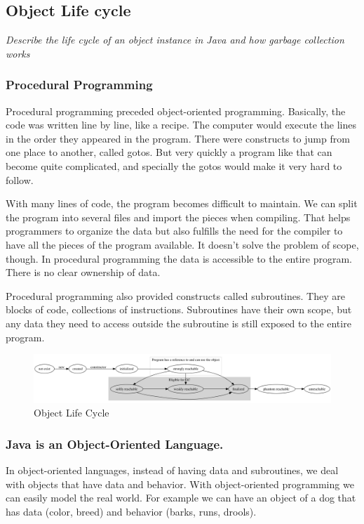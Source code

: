 \subsection{Object Life cycle}
\begin{center}\textit{Describe the life cycle of an object instance in Java and how garbage collection works}\end{center}

\subsubsection{Procedural Programming} 
Procedural programming preceded object-oriented programming. Basically, the code was written line by line, like a recipe. The computer would execute the lines in the order they appeared in the program. There were constructs to jump from one place to another, called gotos. But very quickly a program like that can become quite complicated, and specially the gotos would make it very hard to follow. 

With many lines of code, the program becomes difficult to maintain. We can split the program into several files and import the pieces when compiling. That helps programmers to organize the data but also fulfills the need for the compiler to have all the pieces of the program available. It doesn't solve the problem of scope, though. In procedural programming the data is accessible to the entire program. There is no clear ownership of data.

Procedural programming also provided constructs called subroutines. They are blocks of code, collections of instructions. Subroutines have their own scope, but any data they need to access outside the subroutine is still exposed to the entire program.

\begin{figure}[!htp]\centering %
\includegraphics[width=\textwidth]{object-life-cycle.png}
\caption{Object Life Cycle}
\label{fig:object-life-cycle}
\end{figure}

\subsubsection{Java is an Object-Oriented Language.} In object-oriented languages, instead of having data and subroutines, we deal with objects that have data and behavior. With object-oriented programming we can easily model the real world. For example we can have an object of a dog that has data (color, breed) and behavior (barks, runs, drools). 

